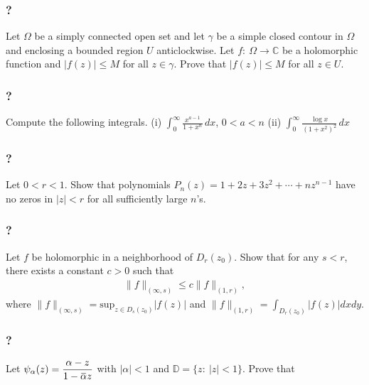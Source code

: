 \hypertarget{section-177}{%
\subsubsection{?}\label{section-177}}

Let \(\Omega\) be a simply connected open set and let \(\gamma\) be a
simple closed contour in \(\Omega\) and enclosing a bounded region \(U\)
anticlockwise. Let \(f: \ \Omega \to {\mathbb C}\) be a holomorphic
function and \(|f(z)|\leq M\) for all \(z\in \gamma\). Prove that
\(|f(z)|\leq M\) for all \(z\in U\).

\hypertarget{section-178}{%
\subsubsection{?}\label{section-178}}

Compute the following integrals. (i)
\(\displaystyle \int_0^\infty \frac{x^{a-1}}{1 + x^n} \, dx\),
\(0< a < n\) (ii)
\(\displaystyle \int_0^\infty \frac{\log x}{(1 + x^2)^2}\, dx\)

\hypertarget{section-179}{%
\subsubsection{?}\label{section-179}}

Let \(0<r<1\). Show that polynomials
\(P_n(z) = 1 + 2z + 3 z^2 + \cdots + n z^{n-1}\) have no zeros in
\(|z|<r\) for all sufficiently large \(n\)'s.

\hypertarget{section-180}{%
\subsubsection{?}\label{section-180}}

Let \(f\) be holomorphic in a neighborhood of \(D_r(z_0)\). Show that
for any \(s<r\), there exists a constant \(c>0\) such that
\begin{align*}\|f\|_{(\infty, s)} \leq c \|f\|_{(1, r)},\end{align*}
where
\(\displaystyle \|f\|_{(\infty, s)} = \text{sup}_{z \in D_s(z_0)}|f(z)|\)
and \(\displaystyle \|f\|_{(1, r)} = \int_{D_r(z_0)} |f(z)|dx dy\).

\hypertarget{section-181}{%
\subsubsection{?}\label{section-181}}

Let
\(\displaystyle{\psi_{\alpha}(z)=\frac{\alpha-z}{1-\mkern 1.5mu\overline{\mkern-1.5mu\alpha\mkern-1.5mu}\mkern 1.5muz}}\)
with \(|\alpha|<1\) and \({\mathbb D}=\{z:\ |z|<1\}\). Prove that

